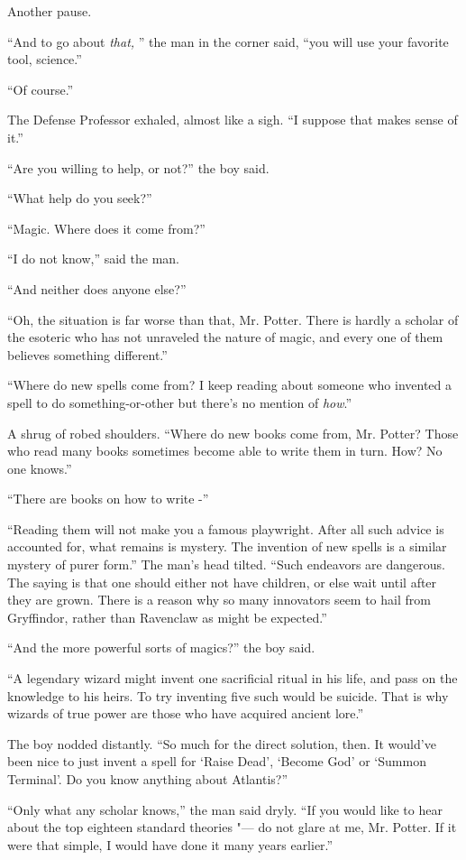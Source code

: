 Another pause.

``And to go about \emph{that,} '' the man in the corner said, ``you will
use your favorite tool, science.''

``Of course.''

The Defense Professor exhaled, almost like a sigh. ``I suppose that
makes sense of it.''

``Are you willing to help, or not?'' the boy said.

``What help do you seek?''

``Magic. Where does it come from?''

``I do not know,'' said the man.

``And neither does anyone else?''

``Oh, the situation is far worse than that, Mr. Potter. There is hardly
a scholar of the esoteric who has not unraveled the nature of magic, and
every one of them believes something different.''

``Where do new spells come from? I keep reading about someone who
invented a spell to do something-or-other but there's no mention of
\emph{how}.''

A shrug of robed shoulders. ``Where do new books come from, Mr. Potter?
Those who read many books sometimes become able to write them in turn.
How? No one knows.''

``There are books on how to write -''

``Reading them will not make you a famous playwright. After all such
advice is accounted for, what remains is mystery. The invention of new
spells is a similar mystery of purer form.'' The man's head tilted.
``Such endeavors are dangerous. The saying is that one should either not
have children, or else wait until after they are grown. There is a
reason why so many innovators seem to hail from Gryffindor, rather than
Ravenclaw as might be expected.''

``And the more powerful sorts of magics?'' the boy said.

``A legendary wizard might invent one sacrificial ritual in his life,
and pass on the knowledge to his heirs. To try inventing five such would
be suicide. That is why wizards of true power are those who have
acquired ancient lore.''

The boy nodded distantly. ``So much for the direct solution, then. It
would've been nice to just invent a spell for `Raise Dead', `Become God'
or `Summon Terminal'. Do you know anything about Atlantis?''

``Only what any scholar knows,'' the man said dryly. ``If you would like
to hear about the top eighteen standard theories "--- do not glare at me,
Mr. Potter. If it were that simple, I would have done it many years
earlier.''

